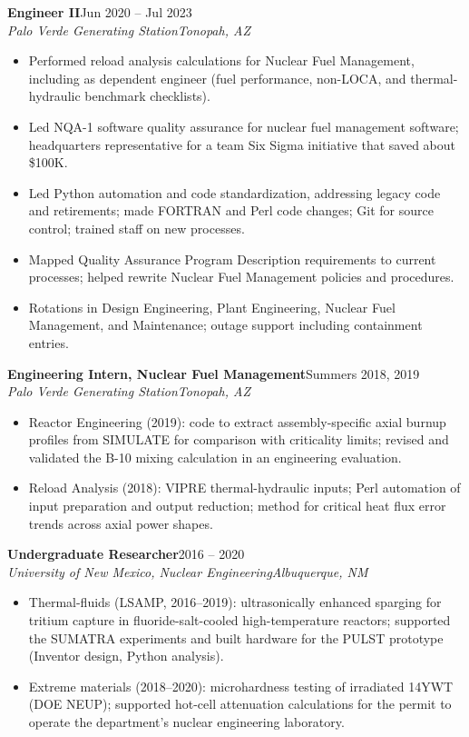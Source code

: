 \documentclass[10pt,letterpaper]{article}
\newcommand{\role}[4]{%
  \textbf{#1}\hfill{\color{muted}#3}\\
  {\itshape #2}\hfill{\color{muted}\itshape #4}\par\vspace{1pt}}
\begin{document}
\role{Engineer II}{Palo Verde Generating Station}{Jun 2020 -- Jul 2023}{Tonopah, AZ}
\begin{itemize}
  \item Performed reload analysis calculations for Nuclear Fuel Management, including as dependent engineer (fuel performance, non-LOCA, and thermal-hydraulic benchmark checklists).
  \item Led NQA-1 software quality assurance for nuclear fuel management software; headquarters representative for a team Six Sigma initiative that saved about \$100K.
  \item Led Python automation and code standardization, addressing legacy code and retirements; made FORTRAN and Perl code changes; Git for source control; trained staff on new processes.
  \item Mapped Quality Assurance Program Description requirements to current processes; helped rewrite Nuclear Fuel Management policies and procedures.
  \item Rotations in Design Engineering, Plant Engineering, Nuclear Fuel Management, and Maintenance; outage support including containment entries.
\end{itemize}

\role{Engineering Intern, Nuclear Fuel Management}{Palo Verde Generating Station}{Summers 2018, 2019}{Tonopah, AZ}
\begin{itemize}
  \item Reactor Engineering (2019): code to extract assembly-specific axial burnup profiles from SIMULATE for comparison with criticality limits; revised and validated the B-10 mixing calculation in an engineering evaluation.
  \item Reload Analysis (2018): VIPRE thermal-hydraulic inputs; Perl automation of input preparation and output reduction; method for critical heat flux error trends across axial power shapes.
\end{itemize}

\role{Undergraduate Researcher}{University of New Mexico, Nuclear Engineering}{2016 -- 2020}{Albuquerque, NM}
\begin{itemize}
  \item Thermal-fluids (LSAMP, 2016--2019): ultrasonically enhanced sparging for tritium capture in fluoride-salt-cooled high-temperature reactors; supported the SUMATRA experiments and built hardware for the PULST prototype (Inventor design, Python analysis).
  \item Extreme materials (2018--2020): microhardness testing of irradiated 14YWT (DOE NEUP); supported hot-cell attenuation calculations for the permit to operate the department's nuclear engineering laboratory.
\end{itemize}
\end{document}
